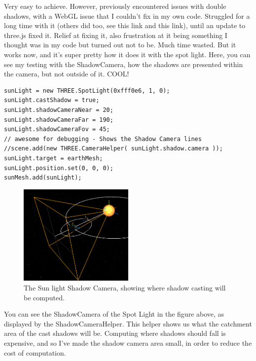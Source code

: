 \documentclass[12pt]{article}
\begin{document}
Very easy to achieve. However, previously encountered issues with double shadows, with a WebGL issue that I couldn't fix in my own code. Struggled for a long time with it (others did too, see this link and this link), until an update to three.js fixed it. Relief at fixing it, also frustration at it being something I thought was in my code but turned out not to be. Much time wasted. But it works now, and it's super pretty how it does it with the spot light. Here, you can see my testing with the ShadowCamera, how the shadows are presented within the camera, but not outside of it. COOL!
\begin{lstlisting}
sunLight = new THREE.SpotLight(0xfff0e6, 1, 0);
sunLight.castShadow = true;
sunLight.shadowCameraNear = 20;
sunLight.shadowCameraFar = 190;
sunLight.shadowCameraFov = 45;
// awesome for debugging - Shows the Shadow Camera lines
//scene.add(new THREE.CameraHelper( sunLight.shadow.camera ));
sunLight.target = earthMesh;    
sunLight.position.set(0, 0, 0);
sunMesh.add(sunLight);
\end{lstlisting}

\begin{figure}[H]
        \centering
       
                \includegraphics[width=0.5\textwidth]{images/shadowcamera}
                \caption{The Sun light Shadow Camera, showing where shadow casting will be computed.}
                \label{fig: The Shadow Camera.}
      
\end{figure}

You can see the ShadowCamera of the Spot Light in the figure above, as displayed by the ShadowCameraHelper. This helper shows us what the catchment area of the cast shadows will be. Computing where shadows should fall is expensive, and so I've made the shadow camera area small, in order to reduce the cost of computation.
\end{document}

